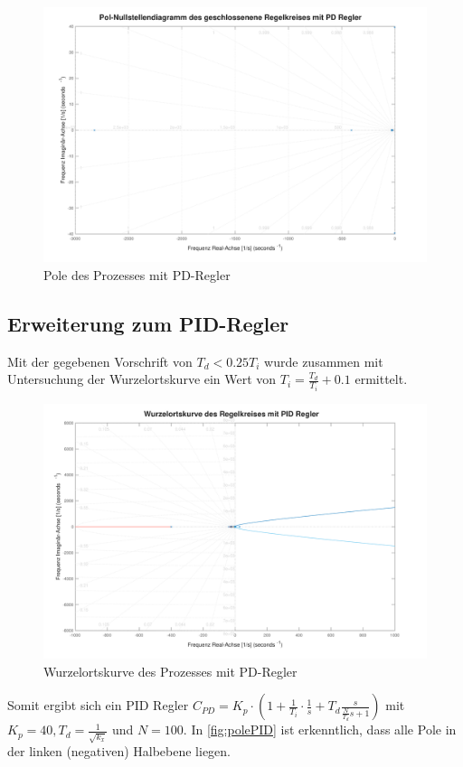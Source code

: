 			\begin{figure}[H]
				\centering
				\includegraphics[width=.9\textwidth]{./figure/polemap_pd_untuned.pdf}
				\caption{Pole des Prozesses mit PD-Regler}
				\label{fig:polePD}
			\end{figure}
\newpage
	\subsection*{Erweiterung zum PID-Regler}
	Mit der gegebenen Vorschrift von $T_d < 0.25 T_i$ wurde zusammen mit Untersuchung der Wurzelortskurve ein Wert von $T_i = \frac{T_d}{T_i} + 0.1$ ermittelt.



	\begin{figure}[H]
				\centering
				\includegraphics[width=.9\textwidth]{./figure/rlocus_pid_untuned.pdf}
				\caption{Wurzelortskurve des Prozesses mit PD-Regler}
				\label{fig:rlocusPID}
			\end{figure}


			Somit ergibt sich ein PID Regler $C_{PD} = K_p \cdot \left(  1 +\frac{1}{T_i}\cdot \frac{1}{s} + T_d \frac{s}{\frac{N}{T_d}s + 1} \right)$ mit $K_p=40, T_d = \frac{1}{\sqrt{k_x}}$ und $N=100$.
			\newpage
			In \autoref{fig:polePID} ist erkenntlich, dass alle Pole in der linken (negativen) Halbebene liegen.

